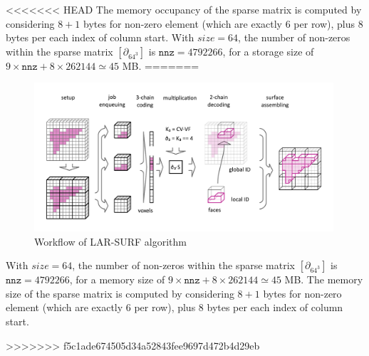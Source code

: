 <<<<<<< HEAD
The memory occupancy of the sparse matrix is computed by considering $8+1$ bytes for non-zero element (which are exactly 6 per row), plus 8 bytes per each index of column start.  
With $size=64$, the number of non-zeros within the sparse matrix $[\partial_{64^3}]$ is $\mathtt{nnz} = 4 792 266$, for a storage size of $9\times \mathtt{nnz}+8\times 262144 \simeq 45$ MB. 
=======
\begin{figure}[htbp]
\includegraphics[width=0.99\textwidth]{figs/schema_horizontal.pdf} 
\caption{Workflow of LAR-SURF algorithm}
\label{fig:schema}
\end{figure}

With $size=64$, the number of non-zeros within the sparse matrix $[\partial_{64^3}]$ is $\mathtt{nnz} = 4 792 266$, for a memory size of $9\times \mathtt{nnz}+8\times 262144 \simeq 45$ MB. The memory size of the sparse matrix is computed by considering $8+1$ bytes for non-zero element (which are exactly 6 per row), plus 8 bytes per each index of column start.  

>>>>>>> f5c1ade674505d34a52843fee9697d472b4d29eb

